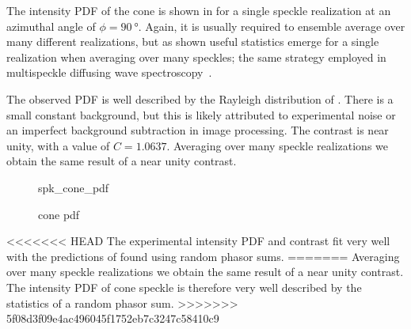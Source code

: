 The intensity PDF of the cone is shown in  for a single
speckle realization at an azimuthal angle of $\phi=\SI{90}{\degree}$.
Again, it is usually required to ensemble average over many different
realizations, but as shown useful statistics emerge for a single
realization when averaging over many speckles; the same strategy employed
in multispeckle diffusing wave spectroscopy~\cite{zakharov2006multispeckle}.

The observed PDF is well described by the Rayleigh distribution of
.  There is a small constant background, but this is
likely attributed to experimental noise or an imperfect background
subtraction in image processing.  The contrast is near unity, with a value
of $C=1.0637$.  Averaging over many speckle realizations we obtain the same
result of a near unity contrast.  
\begin{figure}[ht]
\centering
{spk_cone_pdf}
\caption{cone pdf}
\label{fig:conepdf}
\end{figure}

<<<<<<< HEAD
The experimental intensity PDF and contrast fit very well with the
predictions of found using random phasor sums.  
=======
Averaging over many speckle realizations we obtain the same result of a
near unity contrast.  The intensity PDF of cone speckle is therefore very
well described by the statistics of a random phasor sum.
>>>>>>> 5f08d3f09e4ac496045f1752eb7c3247c58410c9
